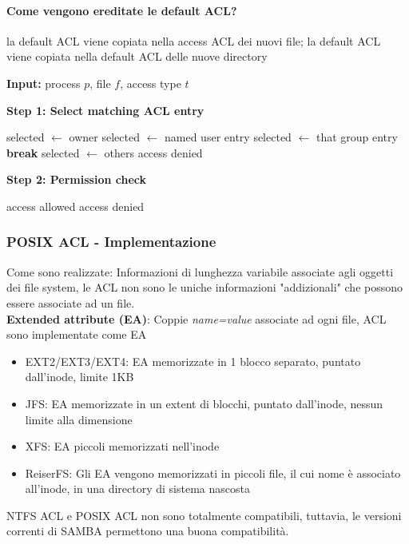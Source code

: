 \documentclass[a4paper,12pt]{article}
\begin{document}
\paragraph{Come vengono ereditate le default ACL?} la default ACL viene copiata nella access ACL dei nuovi file; la default ACL viene copiata nella default ACL delle nuove
directory
\begin{algorithm}[H]
\caption{POSIX ACL access control}
\begin{algorithmic}

\State \textbf{Input:} process $p$, file $f$, access type $t$

\State \textbf{Step 1: Select matching ACL entry}

    \State selected $\leftarrow$ owner
    \State selected $\leftarrow$ named user entry
            \State selected $\leftarrow$ that group entry
            \State \textbf{break}
        \EndIf
    \EndFor
{}
    \State selected $\leftarrow$ others
\Else
    \State access denied
\EndIf

\State \textbf{Step 2: Permission check}

    \State access allowed
\Else
    \State access denied
\EndIf

\end{algorithmic}
\end{algorithm}
\subsubsection*{POSIX ACL - Implementazione}
Come sono realizzate: Informazioni di lunghezza variabile associate agli oggetti dei file
system, le ACL non sono le uniche informazioni "addizionali" che
possono essere associate ad un file.\\
\textbf{Extended attribute (EA)}: Coppie \textit{name=value} associate ad ogni file, ACL sono implementate come EA
\begin{itemize}
  \item EXT2/EXT3/EXT4: EA memorizzate in 1 blocco separato, puntato dall'inode, limite 1KB
  \item JFS: EA memorizzate in un extent di blocchi, puntato dall'inode, nessun limite alla dimensione
  \item XFS: EA piccoli memorizzati nell'inode
  \item ReiserFS: Gli EA vengono memorizzati in piccoli file, il cui nome è
associato all'inode, in una directory di sistema nascosta
\end{itemize}
NTFS ACL e POSIX ACL non sono totalmente compatibili, tuttavia, le versioni correnti di SAMBA permettono una buona compatibilità.
\end{document}

